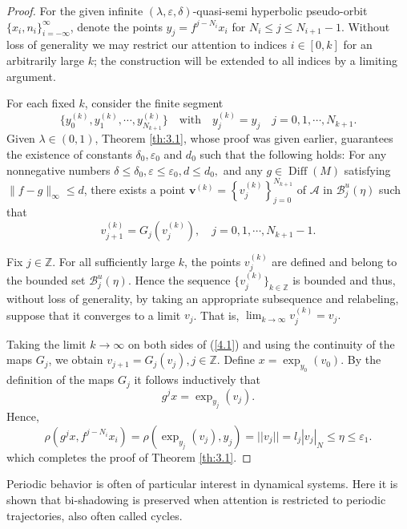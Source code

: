 \documentclass[12pt]{article}
\begin{document}
\begin{proof}
	For the given infinite $(\lambda,\varepsilon,\delta)$-quasi-semi hyperbolic pseudo-orbit $  \{x_{i},n_{i}\}_{i=-\infty}^{\infty} $, denote the points $  y_{j}=f^{j-N_{i}}x_{i}$ for $ N_{i}\leqslant j\leqslant N_{i+1}-1.$ Without loss of generality we may restrict our attention to indices $ i\in [0,k] $ for an arbitrarily large $ k $; the construction will be extended to all indices by a limiting argument. 
	
	For each fixed $ k $, consider the finite​ segment $$ \{y_{0}^{(k)},y_{1}^{(k)},\cdots,y_{N_{k+1}}^{(k)}\}\quad \text{with} \quad y_{j}^{(k)}=y_{j}\quad j=0,1,\cdots,N_{k+1}.$$  
	Given $\lambda \in (0,1)$, Theorem \ref{th:3.1}, whose proof was given earlier, guarantees the existence of constants $\delta_0, \varepsilon_0$ and $d_0$ such that the following holds: For any nonnegative numbers $ \delta\leqslant\delta_0,\varepsilon\leqslant\varepsilon_0,d\leqslant d_0,$ and any $g \in \operatorname{Diff}(M)$ satisfying $ \|f - g\|_\infty\leqslant d $, there exists a point $ \boldsymbol{v}^{(k)}=\left\{v_j^{(k)}\right\}_{j=0}^{N_{k+1}} $ of $ \mathcal{A} $ in $ \mathcal{B}_{j}^{u}(\eta) $ such that 
	\begin{equation}\label{4.1}v_{j+1}^{(k)} = G_j(v_j^{(k)}),\quad j=0,1,\cdots,N_{k+1}-1.\end{equation}
	
	Fix $j \in \mathbb{Z}$. For all sufficiently large $ k $, the points $ v_j^{(k)} $ are defined and belong to the bounded set $ \mathcal{B}_{j}^{u}(\eta) $. Hence the sequence $\{v_j^{(k)}\}_{k \in \mathbb{Z}}$ is bounded and thus, without loss of generality, by taking an appropriate subsequence and relabeling, suppose that it converges to a limit $v_j$. That is, $\lim_{k \to \infty} v_j^{(k)} = v_j.$
	
	Taking the limit $k \to \infty$ on both sides of (\ref{4.1}) and using the continuity of the maps $ G_j $, we obtain $v_{j+1}=G_j\left(v_j\right), j \in \mathbb{Z}$. Define $ x=\exp_{y_0}(v_0)$. By the definition of the maps $ G_{j} $ it follows inductively that
	$$
	g^{j}x=\exp_{y_j}(v_j).
	$$
	Hence,
	$$
	\rho(g^{j} x,f^{j-N_{i}}x_i)=\rho(\exp_{y_j}(v_j),y_j)=||v_j||=l_{j}|v_j|_{N}\leqslant \eta \leqslant \varepsilon_1.
	$$
	which completes the proof of Theorem \ref{th:3.1}.
\end{proof}

Periodic behavior is often of particular interest in dynamical systems. Here it is 
shown that bi-shadowing is preserved when attention is restricted to periodic trajectories, also often called cycles.
\end{document}
